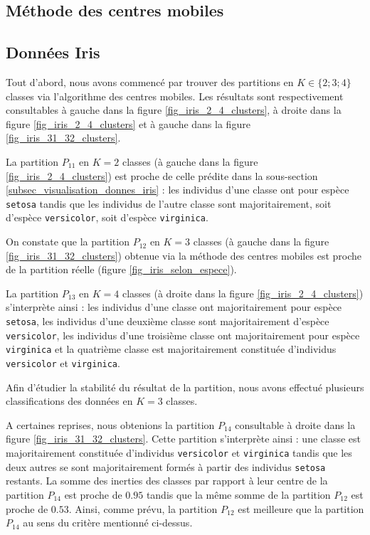 \documentclass{article}
\begin{document}
\begin{multicols}{2}
\section{Méthode des centres mobiles}
\label{sec_methode_centres_mobiles}

\subsection{Données Iris}
\label{subsec_methode_centres_mobiles_iris}
Tout d'abord, nous avons commencé par trouver des partitions en $K \in \{2 ; 3 ; 4\}$ classes via l'algorithme des centres mobiles. Les résultats sont respectivement consultables à gauche dans la figure \ref{fig_iris_2_4_clusters}, à droite dans la figure \ref{fig_iris_2_4_clusters} et à gauche dans la figure \ref{fig_iris_31_32_clusters}.

La partition $P_{11}$ en $K = 2$ classes (à gauche dans la figure \ref{fig_iris_2_4_clusters}) est proche de celle prédite dans la sous-section \ref{subsec_visualisation_donnes_iris} : les individus d'une classe ont pour espèce \texttt{setosa} tandis que les individus de l'autre classe sont majoritairement, soit d'espèce \texttt{versicolor}, soit d'espèce \texttt{virginica}.

On constate que la partition $P_{12}$ en $K = 3$ classes (à gauche dans la figure \ref{fig_iris_31_32_clusters}) obtenue via la méthode des centres mobiles est proche de la partition réelle (figure \ref{fig_iris_selon_espece}).

La partition $P_{13}$ en $K = 4$ classes (à droite dans la figure \ref{fig_iris_2_4_clusters}) s'interprète ainsi : les individus d'une classe ont majoritairement pour espèce \texttt{setosa}, les individus d'une deuxième classe sont majoritairement d'espèce \texttt{versicolor}, les individus d'une troisième classe ont majoritairement pour espèce \texttt{virginica} et la quatrième classe est majoritairement constituée d'individus \texttt{versicolor} et \texttt{virginica}.

Afin d'étudier la stabilité du résultat de la partition, nous avons effectué plusieurs classifications des données en $K = 3$ classes. 

A certaines reprises, nous obtenions la partition $P_{14}$ consultable à droite dans la figure  \ref{fig_iris_31_32_clusters}. Cette partition s'interprète ainsi : une classe est majoritairement constituée d'individus \texttt{versicolor} et \texttt{virginica} tandis que les deux autres se sont majoritairement formés à partir des individus \texttt{setosa} restants. La somme des inerties des classes par rapport à leur centre de la partition $P_{14}$ est proche de $0.95$ tandis que la même somme de la partition $P_{12}$ est proche de $0.53$. Ainsi, comme prévu, la partition $P_{12}$ est meilleure que la partition $P_{14}$ au sens du critère mentionné ci-dessus.


\end{multicols}
\end{document}
